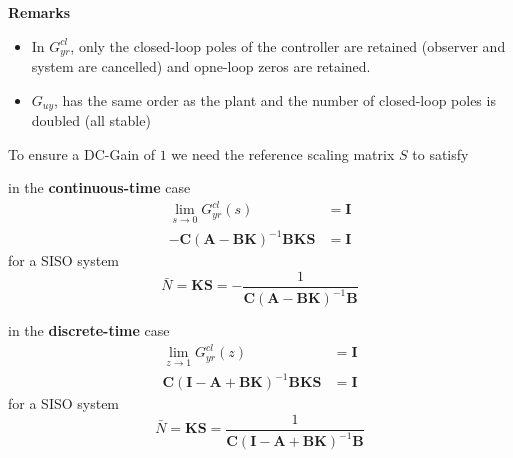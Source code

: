 \textbf{Remarks}
\begin{itemize}
    \item In $G_{yr}^{cl}$, only the closed-loop poles of the controller are retained (observer and system are cancelled) and opne-loop zeros are retained.
    \item $G_{uy}$, has the same order as the plant and the number of closed-loop poles is doubled (all stable)
\end{itemize}



To ensure a DC-Gain of $1$ we need the reference scaling matrix $S$ to satisfy

in the \textbf{continuous-time} case
\begin{align*}
    \lim_{s\to0}G_{yr}^{cl}(s)                             & = \mathbf{I} \\
    -\mathbf{C}{(\mathbf{A}-\mathbf{BK})}^{-1}\mathbf{BKS} & = \mathbf{I}
\end{align*}
for a SISO system
\begin{equation*}
    \bar{N}=\mathbf{KS}=-\frac{1}{\mathbf{C}{(\mathbf{A}-\mathbf{BK})}^{-1}\mathbf{B}}
\end{equation*}

in the \textbf{discrete-time} case
\begin{align*}
    \lim_{z\to1}G_{yr}^{cl}(z)                                       & = \mathbf{I} \\
    \mathbf{C}{(\mathbf{I}-\mathbf{A}+\mathbf{BK})}^{-1}\mathbf{BKS} & = \mathbf{I}
\end{align*}
for a SISO system
\begin{equation*}
    \bar{N}=\mathbf{KS}=\frac{1}{\mathbf{C}{(\mathbf{I}-\mathbf{A}+\mathbf{BK})}^{-1}\mathbf{B}}
\end{equation*}


